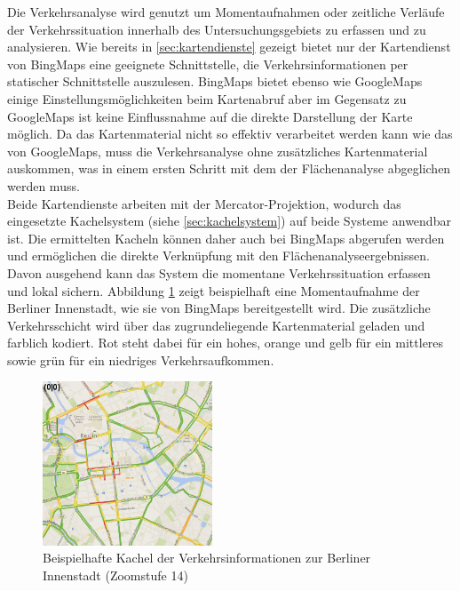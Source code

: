 Die Verkehrsanalyse wird genutzt um Momentaufnahmen oder zeitliche Verläufe der Verkehrssituation innerhalb des Untersuchungsgebiets zu erfassen und zu analysieren. Wie bereits in \ref{sec:kartendienste} gezeigt bietet nur der Kartendienst von BingMaps eine geeignete Schnittstelle, die Verkehrsinformationen per statischer Schnittstelle auszulesen. BingMaps bietet ebenso wie GoogleMaps einige Einstellungsmöglichkeiten beim Kartenabruf aber im Gegensatz zu GoogleMaps ist keine Einflussnahme auf die direkte Darstellung der Karte möglich. Da das Kartenmaterial nicht so effektiv verarbeitet werden kann wie das von GoogleMaps, muss die Verkehrsanalyse ohne zusätzliches Kartenmaterial auskommen, was in einem ersten Schritt mit dem der Flächenanalyse abgeglichen werden muss.\\

Beide Kartendienste arbeiten mit der Mercator-Projektion, wodurch das eingesetzte Kachelsystem (siehe \ref{sec:kachelsystem}) auf beide Systeme anwendbar ist. Die ermittelten Kacheln können daher auch bei BingMaps abgerufen werden und ermöglichen die direkte Verknüpfung mit den Flächenanalyseergebnissen. Davon ausgehend kann das System die momentane Verkehrssituation erfassen und lokal sichern. Abbildung \ref{fig:berlin_traffic} zeigt beispielhaft eine Momentaufnahme der Berliner Innenstadt, wie sie von BingMaps bereitgestellt wird. Die zusätzliche Verkehrsschicht wird über das zugrundeliegende Kartenmaterial geladen und farblich kodiert. Rot steht dabei für ein hohes, orange und gelb für ein mittleres sowie grün für ein niedriges Verkehrsaufkommen.

\begin{figure}
  \centering
    \includegraphics[width=0.45\textwidth]{images/traffic_berlin.png}
    \caption{Beispielhafte Kachel der Verkehrsinformationen zur Berliner Innenstadt (Zoomstufe 14)}
    \label{fig:berlin_traffic}
\end{figure}

